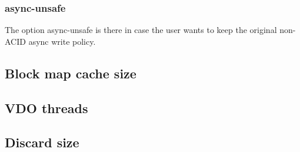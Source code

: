 \documentclass[
  color, %
  table, %
  lof,   %
  lot,   %
]{fithesis3}
\begin{document}
\subsubsection{async-unsafe}
The option async-unsafe is there in case the user wants to keep the original non-ACID async write policy.


\subsection{Block map cache size}

\subsection{VDO threads}

\subsection{Discard size}







\end{document}
